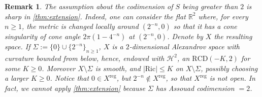 \documentclass[12pt,a4paper,reqno]{amsart}
\newtheorem{remark}[theorem]{Remark}
\renewcommand{\leq}{\leqslant}
\renewcommand{\geq}{\geqslant}
\begin{document}
\begin{remark}\label{rem:Codimension-Sharp}
The assumption about the codimension of $S$ being greater than $2$ is sharp in \cref{thm:extension}. Indeed, one can consider the flat $\mathbb R^2$ where, for every $n\geq 1$, the metric is changed locally around $(2^{-n},0)$ so that it has a cone singularity of cone angle $2\pi(1-4^{-n})$ at $(2^{-n},0)$. Denote by $X$ the resulting space. If $\Sigma:=\{0\}\cup\{2^{-n}\}_{n\geq 1}$, $X$ is a $2$-dimensional Alexandrov space with curvature bounded from below, hence, endowed with $\mathcal{H}^2$, an $\mathrm{RCD}(-K,2)$ for some $K\geq 0$. Moreover $X\setminus \Sigma$ is smooth, and $|\mathrm{Ric}|\leq K$ on $X\setminus \Sigma$, possibly choosing a larger $K\geq 0$. Notice that $0\in X^{\mathrm{reg}}$, but $2^{-n}\notin X^{\mathrm{reg}}$, so that $X^{\mathrm{reg}}$ is not open. In fact, we cannot apply \cref{thm:extension} because $\Sigma$ has Assouad codimension $=2$.
\end{remark}
\end{document}
